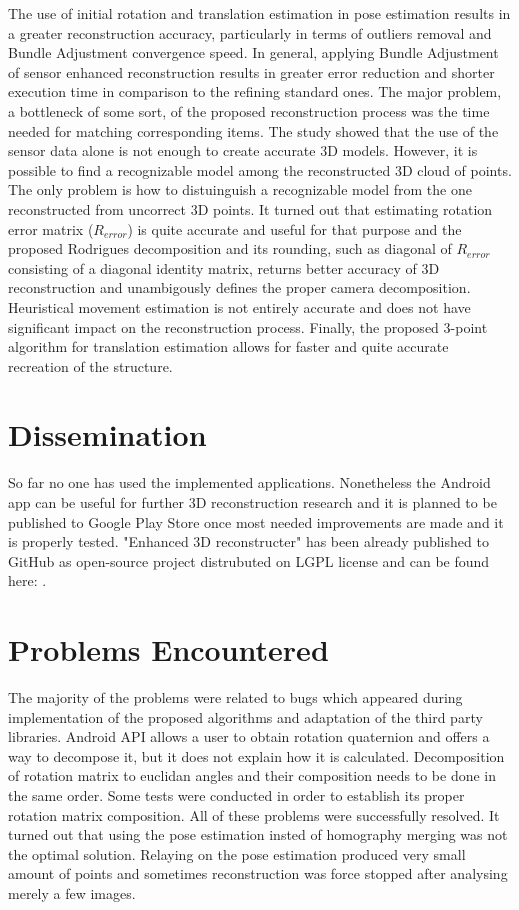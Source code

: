 The use of initial rotation and translation estimation in pose estimation results in a greater reconstruction accuracy, particularly in terms of outliers removal and Bundle Adjustment convergence speed. 
In general, applying Bundle Adjustment of sensor enhanced reconstruction results in greater error reduction and shorter execution time in comparison to the refining standard ones. The major problem, a bottleneck of some sort, of the proposed reconstruction process was the time needed for matching corresponding items. 
The study showed that the use of the sensor data alone is not enough to create accurate 3D models. However, it is possible to find a recognizable model among the reconstructed 3D cloud of points. The only problem is how to distuinguish a recognizable model from the one reconstructed from uncorrect 3D points. It turned out that estimating rotation error matrix ($R_{error}$) is quite accurate and useful for that purpose and the proposed Rodrigues decomposition and its rounding, such as diagonal of $R_{error}$ consisting of a diagonal identity matrix, returns better accuracy of 3D reconstruction and unambigously defines the proper camera decomposition. Heuristical movement estimation is not entirely accurate and does not have significant impact on the reconstruction process. Finally, the proposed 3-point algorithm for translation estimation allows for faster and quite accurate recreation of the structure.
\section{Dissemination}
So far no one has used the implemented applications. Nonetheless the Android app can be useful for further 3D reconstruction research and it is planned to be published to Google Play Store once most needed improvements are made and it is properly tested. "Enhanced 3D reconstructer" has been already published to GitHub as open-source project distrubuted on LGPL license and can be found here: \cite{website:3dReconstructerMasterThesis}.
\section{Problems Encountered}
The majority of the problems were related to bugs which appeared during implementation of the proposed algorithms and adaptation of the third party libraries. Android API allows a user to obtain rotation quaternion and offers a way to decompose it, but it does not explain how it is calculated. Decomposition of rotation matrix to euclidan angles and their composition needs to be done in the same order. Some tests were conducted in order to establish its proper rotation matrix composition. All of these problems were successfully resolved. It turned out that using the pose estimation insted of homography merging was not the optimal solution. Relaying on the pose estimation produced very small amount of points and sometimes reconstruction was force stopped after analysing merely a few images.
